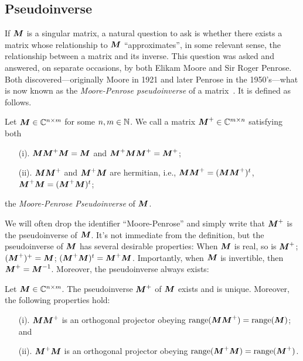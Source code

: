 \subsection{Pseudoinverse}
\label{sec:background_pseudoinverse}

If ${\vb*{M}}$ is a singular matrix, a natural question to ask is whether there exists a matrix whose relationship to ${\vb*{M}}$ ``approximates'', in some relevant sense, the relationship between a matrix and its inverse. This question  was asked and answered, on separate occasions, by both Elikam Moore and Sir Roger Penrose. Both discovered---originally Moore in 1921 and later Penrose in the 1950's---what is now known as the \emph{Moore-Penrose pseudoinverse} of a matrix~\cite{moore1920reciprocal, penrose1955generalized,penrose1956best}. It is defined as follows. 

\begin{definition}
\label{def:pseudoinverse}
Let ${\vb*{M}}\in\mathbb{C}^{n\times m}$ for some $n,m\in\mathbb{N}$. We call a matrix ${\vb*{M}}^+\in\mathbb{C}^{m\times n}$ satisfying both
\begin{enumerate}
    \item[(i).] ${\vb*{M}}{\vb*{M}}^+{\vb*{M}}={\vb*{M}}$ and ${\vb*{M}}^+{\vb*{M}}{\vb*{M}}^+={\vb*{M}}^+$;
    \item[(ii).] ${\vb*{M}}{\vb*{M}}^+$ and ${\vb*{M}}^+{\vb*{M}}$ are hermitian, i.e., ${\vb*{M}}{\vb*{M}}^+=({\vb*{M}}{\vb*{M}}^+)^t $, ${\vb*{M}}^+{\vb*{M}}=({\vb*{M}}^+{\vb*{M}})^t$; 
\end{enumerate}
the \emph{Moore-Penrose Pseudoinverse} of ${\vb*{M}}$. 
\end{definition}

We will often drop the identifier ``Moore-Penrose'' and simply write that ${\vb*{M}}^+$ is the pseudoinverse of ${\vb*{M}}$. It's not immediate from  the definition, but the pseudoinverse of ${\vb*{M}}$ has several desirable properties: When ${\vb*{M}}$ is real, so is ${\vb*{M}}^+$; $({\vb*{M}}^+)^+={\vb*{M}}$; $({\vb*{M}}^+{\vb*{M}})^t = {\vb*{M}}^+{\vb*{M}}$. Importantly, when ${\vb*{M}}$ is invertible, then ${\vb*{M}}^+={\vb*{M}}^{-1}$. Moreover, the pseudoinverse always exists: 

\begin{lemma}
	\label{lem:pseudoinverse_properties}
Let ${\vb*{M}}\in \mathbb{C}^{n\times m}$. The pseudoinverse  ${\vb*{M}}^+$ of ${\vb*{M}}$ exists and is unique. Moreover, the following properties hold: 
\begin{enumerate}
    \item[(i).] ${\vb*{M}}{\vb*{M}}^+$ is an orthogonal projector obeying $\textnormal{range}({\vb*{M}}{\vb*{M}}^+)=\textnormal{range}({\vb*{M}})$; and 
    \item[(ii).] ${\vb*{M}}^+{\vb*{M}}$ is an orthogonal projector obeying $\textnormal{range}({\vb*{M}}^+{\vb*{M}})=\textnormal{range}({\vb*{M}}^+)$. 
\end{enumerate}
\end{lemma}

